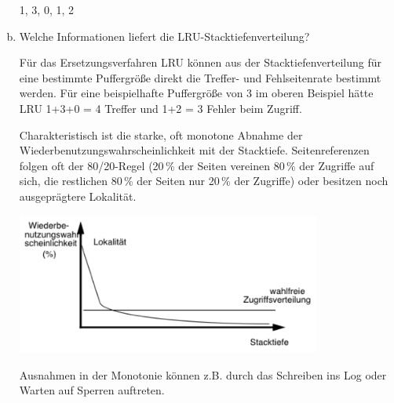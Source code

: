 \begin{enumerate}[a)]
\begin{solution}
\begin{minipage}{0.65\textwidth}
						1, 3, 0, 1, 2
        \end{minipage}

\end{solution}

\item Welche Informationen liefert die LRU-Stacktiefenverteilung?

\begin{solution}
Für das Ersetzungsverfahren LRU können aus der Stacktiefenverteilung für eine bestimmte Puffergröße direkt die Treffer- und Fehlseitenrate bestimmt werden.
Für eine beispielhafte Puffergröße von 3 im oberen Beispiel hätte LRU 1+3+0 = 4 Treffer und 1+2 = 3 Fehler beim Zugriff.

Charakteristisch ist die starke, oft monotone Abnahme der Wiederbenutzungswahrscheinlichkeit mit der Stacktiefe.
Seitenreferenzen folgen oft der 80/20-Regel (20\,\% der Seiten vereinen 80\,\% der Zugriffe auf sich, die restlichen 80\,\% der Seiten nur 20\,\% der Zugriffe) oder besitzen noch ausgeprägtere Lokalität.

\begin{center}
\includegraphics[width = 10cm]{Pictures/Ue07_Aufgabe2_Zusatz2.png}
\end{center}

Ausnahmen in der Monotonie können z.B. durch das Schreiben ins Log oder Warten auf Sperren auftreten.
\end{solution}


\end{enumerate}
